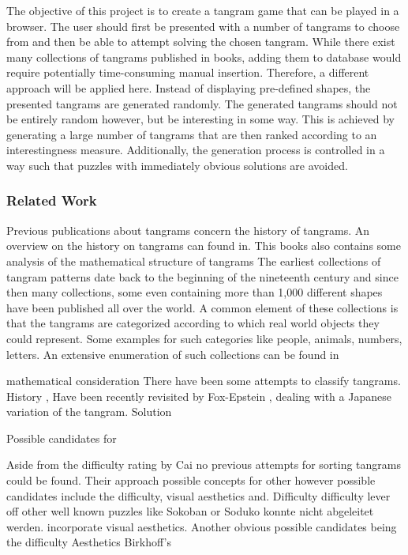 The objective of this project is to create a tangram game that can be played in a browser. The user should first be presented with a number of tangrams to choose from and then be able to attempt solving the chosen tangram. 
While there exist many collections of tangrams published in books, adding them to database would require potentially time-consuming manual insertion. Therefore, a different approach will be applied here. Instead of displaying pre-defined shapes, the presented tangrams are generated randomly. The generated tangrams should not be entirely random however, but be interesting in some way. This is achieved by generating a large number of tangrams that are then ranked according to an interestingness measure. Additionally, the generation process is controlled in a way such that puzzles with immediately obvious solutions are avoided. 

\subsubsection*{Related Work}

Previous publications about tangrams concern the history of tangrams. 
An overview on the history on tangrams can found in. This books also contains some analysis of the mathematical structure of tangrams 
The earliest collections of tangram patterns date back to the beginning of the nineteenth century \cite{elffers76} and since then many collections, some even containing more than 1,000 different shapes have been published all over the world. A common element of these collections is that the tangrams are categorized according to which real world objects they could represent. Some examples for such categories 
like people, animals, numbers, letters. An extensive enumeration of such collections can be found in \cite{slocum03}

mathematical consideration
There have been some attempts to classify tangrams. 
History , \cite{wang42} 
Have been recently revisited by Fox-Epstein \cite{foxepstein14}, dealing with a Japanese variation of the tangram.
Solution \cite{deutsch72} \cite{oflazer93} \cite{kovalsky14}

Possible candidates for 

Aside from the difficulty rating by Cai \etal \cite{cai08} no previous attempts for sorting tangrams could be found. Their approach 
possible concepts for other 
however possible candidates include the difficulty, visual aesthetics and. 
Difficulty 
difficulty lever off other well known puzzles like Sokoban \cite{jaruvsek10} or Soduko \cite{hunt07} konnte nicht abgeleitet werden. 
incorporate visual aesthetics.
Another obvious 
possible candidates being the difficulty
Aesthetics \cite{eberle14}
Birkhoff's \cite{filonik09}


